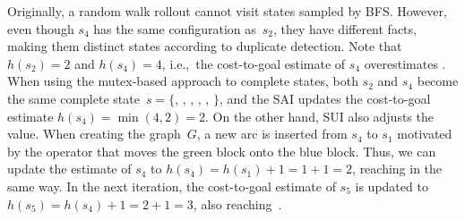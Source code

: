 Originally, a random walk rollout cannot visit states sampled by BFS. However, even though $s_4$ has the same configuration as~$s_2$, they have different facts, making them distinct states according to duplicate detection. Note that $h(s_2)=2$ and $h(s_4)=4$, i.e.,~the cost-to-goal estimate of $s_4$ overestimates \hstar. When using the mutex-based approach to complete states, both $s_2$ and $s_4$ become the same complete state~$s = \{$\mbox{}, \mbox{}, \mbox{}, \mbox{}, \mbox{}, \mbox{}$\}$, and the SAI updates the cost-to-goal estimate $h(s_4)=\min(4,2)=2$. On the other hand, SUI also adjusts the value. When creating the graph~$G$, a new arc is inserted from $s_4$ to $s_1$ motivated by the operator that moves the green block onto the blue block. Thus, we can update the estimate of $s_4$ to $h(s_4)=h(s_1)+1=1+1=2$, reaching \hstar in the same way. In the next iteration, the cost-to-goal estimate of $s_5$ is updated to $h(s_5)=h(s_4)+1=2+1=3$, also reaching~\hstar.
